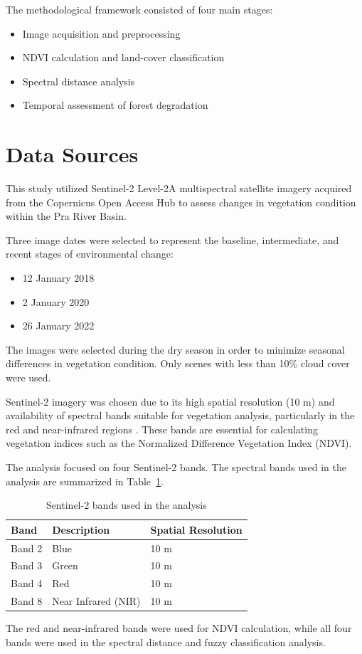 \documentclass[a4paper,12pt]{report}
\begin{document}
The methodological framework consisted of four main stages:

\begin{itemize}
\item Image acquisition and preprocessing
\item NDVI calculation and land-cover classification
\item Spectral distance analysis
\item Temporal assessment of forest degradation
\end{itemize}


\section{Data Sources}

This study utilized Sentinel-2 Level-2A multispectral satellite imagery acquired from the Copernicus Open Access Hub to assess changes in vegetation condition within the Pra River Basin.

Three image dates were selected to represent the baseline, intermediate, and recent stages of environmental change:

\begin{itemize}
\item 12 January 2018
\item 2 January 2020
\item 26 January 2022
\end{itemize}

The images were selected during the dry season in order to minimize seasonal differences in vegetation condition. Only scenes with less than 10\% cloud cover were used.

Sentinel-2 imagery was chosen due to its high spatial resolution (10 m) and availability of spectral bands suitable for vegetation analysis, particularly in the red and near-infrared regions \citep{drusch2012sentinel}. These bands are essential for calculating vegetation indices such as the Normalized Difference Vegetation Index (NDVI).

The analysis focused on four Sentinel-2 bands. The spectral bands used in the analysis are summarized in Table~\ref{tab:bands}.

\begin{table}[H]
\centering
\caption{Sentinel-2 bands used in the analysis}
\label{tab:bands}

\begin{tabular}{lll}
\toprule
Band & Description & Spatial Resolution \\
\midrule
Band 2 & Blue & 10 m \\
Band 3 & Green & 10 m \\
Band 4 & Red & 10 m \\
Band 8 & Near Infrared (NIR) & 10 m \\
\bottomrule
\end{tabular}

\end{table}
The red and near-infrared bands were used for NDVI calculation, while all four bands were used in the spectral distance and fuzzy classification analysis.
\end{document}

